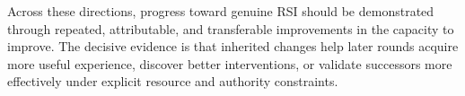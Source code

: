 Across these directions, progress toward genuine RSI should be demonstrated through repeated, attributable, and transferable improvements in the capacity to improve. The decisive evidence is that inherited changes help later rounds acquire more useful experience, discover better interventions, or validate successors more effectively under explicit resource and authority constraints.